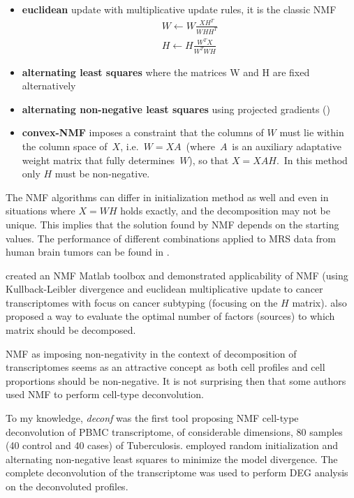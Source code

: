 \documentclass[12pt,]{book}
\providecommand{\tightlist}{%
  \setlength{\itemsep}{0pt}\setlength{\parskip}{0pt}}
\theoremstyle{definition}
\theoremstyle{definition}
\theoremstyle{definition}
\theoremstyle{remark}
\begin{document}
\begin{itemize}
\tightlist
\item
  \textbf{euclidean} update with multiplicative update rules, it is the
  classic NMF \citep{Seung1999} \begin{equation}
  \begin{aligned}
  W \leftarrow W \frac{XH^T}{WHH^T}\\H \leftarrow H\frac{W^TX}{W^TWH}  \label{eq:euclidNMF} 
  \end{aligned}
  \end{equation}
\item
  \textbf{alternating least squares} \citep{Paatero1994} where the
  matrices W and H are fixed alternatively
\item
  \textbf{alternating non-negative least squares} using projected
  gradients (\citet{Lin2007})
\item
  \textbf{convex-NMF }\citep{Ding2010} imposes a constraint that the
  columns of \(W\) must lie within the column space of~\(X\),
  i.e.~\(W = XA\)~(where~\(A\)~is an auxiliary adaptative weight matrix
  that fully determines~\(W\)), so that \(X=XAH\).~In this method only
  \(H\) must be non-negative.
\end{itemize}

The NMF algorithms can differ in initialization method as well and even
in situations where \(X = WH\) holds exactly, and the decomposition may
not be unique. This implies that the solution found by NMF depends on
the starting values. The performance of different combinations applied
to MRS data from human brain tumors can be found in
\citet{OrtegaMartorell2012}.

\citet{Brunet2004} created an NMF Matlab toolbox and demonstrated
applicability of NMF (using Kullback-Leibler divergence and euclidean
multiplicative update \citep{Lee2000} to cancer transcriptomes with
focus on cancer subtyping (focusing on the \(H\) matrix).
\citet{Brunet2004} also proposed a way to evaluate the optimal number of
factors (sources) to which matrix should be decomposed.

NMF as imposing non-negativity in the context of decomposition of
transcriptomes seems as an attractive concept as both cell profiles and
cell proportions should be non-negative. It is not surprising then that
some authors used NMF to perform cell-type deconvolution.

To my knowledge, \emph{deconf} \citep{Repsilber2010} was the first tool
proposing NMF cell-type deconvolution of PBMC transcriptome, of
considerable dimensions, 80 samples (40 control and 40 cases) of
Tuberculosis. \citet{Repsilber2010} employed random initialization and
alternating non-negative least squares to minimize the model divergence.
The complete deconvolution of the transcriptome was used to perform DEG
analysis on the deconvoluted profiles.
\end{document}
